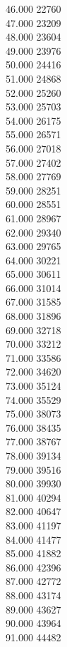 { 46.000	22760 \\
 47.000	23209 \\
 48.000	23604 \\
 49.000	23976 \\
 50.000	24416 \\
 51.000	24868 \\
 52.000	25260 \\
 53.000	25703 \\
 54.000	26175 \\
 55.000	26571 \\
 56.000	27018 \\
 57.000	27402 \\
 58.000	27769 \\
 59.000	28251 \\
 60.000	28551 \\
 61.000	28967 \\
 62.000	29340 \\
 63.000	29765 \\
 64.000	30221 \\
 65.000	30611 \\
 66.000	31014 \\
 67.000	31585 \\
 68.000	31896 \\
 69.000	32718 \\
 70.000	33212 \\
 71.000	33586 \\
 72.000	34620 \\
 73.000	35124 \\
 74.000	35529 \\
 75.000	38073 \\
 76.000	38435 \\
 77.000	38767 \\
 78.000	39134 \\
 79.000	39516 \\
 80.000	39930 \\
 81.000	40294 \\
 82.000	40647 \\
 83.000	41197 \\
 84.000	41477 \\
 85.000	41882 \\
 86.000	42396 \\
 87.000	42772 \\
 88.000	43174 \\
 89.000	43627 \\
 90.000	43964 \\
 91.000	44482 \\
}
